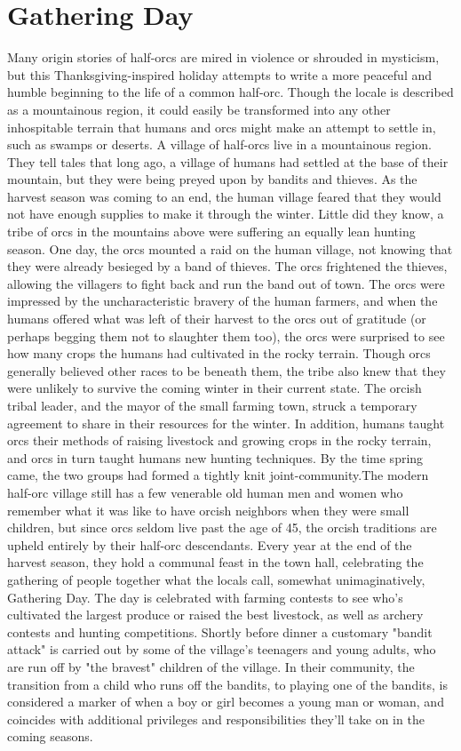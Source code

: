 \documentclass[10pt,a4paper,twoside,twocolumn,openany,bg=print,nodeprecatedcode]{dndbook}
\begin{document}
\section{Gathering Day}
Many origin stories of half-orcs are mired in violence or shrouded in mysticism, but this Thanksgiving-inspired holiday attempts to write a more peaceful and humble beginning to the life of a common half-orc. Though the locale is described as a mountainous region, it could easily be transformed into any other inhospitable terrain that humans and orcs might make an attempt to settle in, such as swamps or deserts.
A village of half-orcs live in a mountainous region. They tell tales that long ago, a village of humans had settled at the base of their mountain, but they were being preyed upon by bandits and thieves. As the harvest season was coming to an end, the human village feared that they would not have enough supplies to make it through the winter. Little did they know, a tribe of orcs in the mountains above were suffering an equally lean hunting season.
One day, the orcs mounted a raid on the human village, not knowing that they were already besieged by a band of thieves. The orcs frightened the thieves, allowing the villagers to fight back and run the band out of town. The orcs were impressed by the uncharacteristic bravery of the human farmers, and when the humans offered what was left of their harvest to the orcs out of gratitude (or perhaps begging them not to slaughter them too), the orcs were surprised to see how many crops the humans had cultivated in the rocky terrain. Though orcs generally believed other races to be beneath them, the tribe also knew that they were unlikely to survive the coming winter in their current state.
The orcish tribal leader, and the mayor of the small farming town, struck a temporary agreement to share in their resources for the winter. In addition, humans taught orcs their methods of raising livestock and growing crops in the rocky terrain, and orcs in turn taught humans new hunting techniques. By the time spring came, the two groups had formed a tightly knit joint-community.The modern half-orc village still has a few venerable old human men and women who remember what it was like to have orcish neighbors when they were small children, but since orcs seldom live past the age of 45, the orcish traditions are upheld entirely by their half-orc descendants. Every year at the end of the harvest season, they hold a communal feast in the town hall, celebrating the gathering of people together what the locals call, somewhat unimaginatively, Gathering Day.
The day is celebrated with farming contests to see who's cultivated the largest produce or raised the best livestock, as well as archery contests and hunting competitions. Shortly before dinner a customary "bandit attack" is carried out by some of the village's teenagers and young adults, who are run off by "the bravest" children of the village. In their community, the transition from a child who runs off the bandits, to playing one of the bandits, is considered a marker of when a boy or girl becomes a young man or woman, and coincides with additional privileges and responsibilities they'll take on in the coming seasons.
\end{document}
